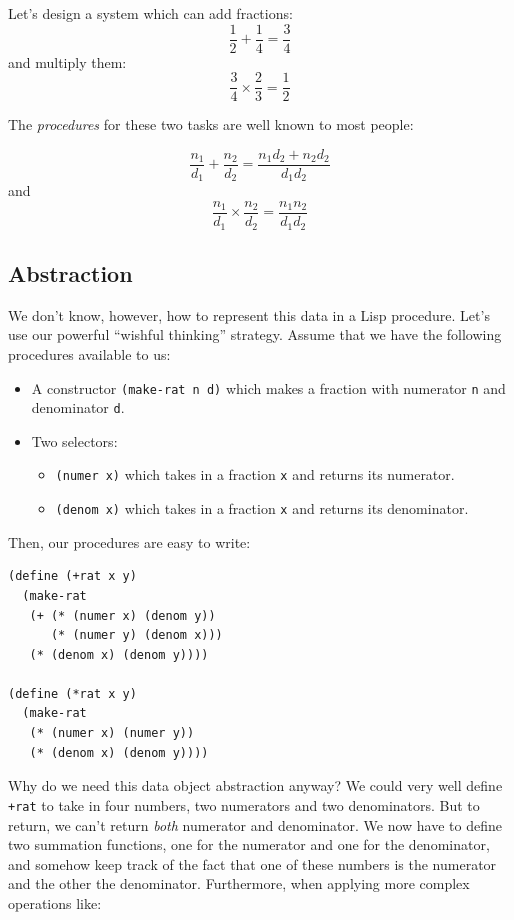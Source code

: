 \documentclass[9pt]{report}
\begin{document}
Let's design a system which can add fractions:
$$\frac{1}{2}+\frac{1}{4}=\frac{3}{4}$$
and multiply them:
$$\frac{3}{4}\times \frac{2}{3} = \frac{1}{2}$$

The \emph{procedures} for these two tasks are well known to most people:

$$\frac{n_1}{d_1} + \frac{n_2}{d_2} = \frac{n_1d_2+n_2d_2}{d_1d_2}$$
and
$$\frac{n_1}{d_1} \times \frac{n_2}{d_2} = \frac{n_1n_2}{d_1d_2}$$

\subsection{Abstraction}
\label{sec:orgc32dfa8}
We don't know, however, how to represent this data in a Lisp
procedure. Let's use our powerful ``wishful thinking'' strategy.
Assume that we have the following procedures available to us:

\begin{itemize}
\item A constructor \texttt{(make-rat n d)} which makes a fraction with
numerator \texttt{n} and denominator \texttt{d}.
\item Two selectors:
\begin{itemize}
\item \texttt{(numer x)} which takes in a fraction \texttt{x} and returns its
numerator.
\item \texttt{(denom x)} which takes in a fraction \texttt{x} and returns its
denominator.
\end{itemize}
\end{itemize}

Then, our procedures are easy to write:

\begin{verbatim}
(define (+rat x y)
  (make-rat
   (+ (* (numer x) (denom y))
      (* (numer y) (denom x)))
   (* (denom x) (denom y))))

(define (*rat x y)
  (make-rat
   (* (numer x) (numer y))
   (* (denom x) (denom y))))
\end{verbatim}

Why do we need this data object abstraction anyway? We could very
well define \texttt{+rat} to take in four numbers, two numerators and two
denominators. But to return, we can't return \emph{both} numerator and
denominator. We now have to define two summation functions, one for
the numerator and one for the denominator, and somehow keep track
of the fact that one of these numbers is the numerator and the other
the denominator. Furthermore, when applying more complex operations
like:
\end{document}
